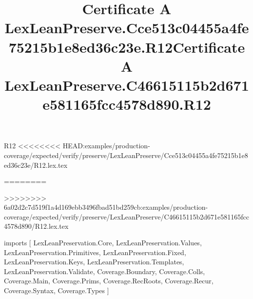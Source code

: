 \begin{lexlean}{R12}
<<<<<<<< HEAD:examples/production-coverage/expected/verify/preserve/LexLeanPreserve/Cce513c04455a4fe75215b1e8ed36c23e/R12.lex.tex
\title{Certificate A LexLeanPreserve.Cce513c04455a4fe75215b1e8ed36c23e.R12}
========
\title{Certificate A LexLeanPreserve.C46615115b2d671e581165fcc4578d890.R12}
>>>>>>>> 6a02d2c7d519f1a4d169ebb3496fbad51bd259cb:examples/production-coverage/expected/verify/preserve/LexLeanPreserve/C46615115b2d671e581165fcc4578d890/R12.lex.tex
\begin{coremodule}
imports [
  LexLeanPreservation.Core,
  LexLeanPreservation.Values,
  LexLeanPreservation.Primitives,
  LexLeanPreservation.Fixed,
  LexLeanPreservation.Keys,
  LexLeanPreservation.Templates,
  LexLeanPreservation.Validate,
  Coverage.Boundary,
  Coverage.Colls,
  Coverage.Main,
  Coverage.Prims,
  Coverage.RecRoots,
  Coverage.Recur,
  Coverage.Syntax,
  Coverage.Types
]


\end{coremodule}
\end{lexlean}
